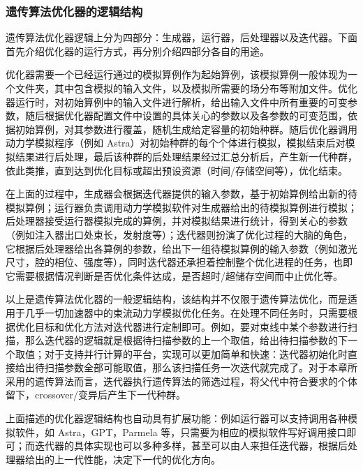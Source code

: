 \subsubsection{遗传算法优化器的逻辑结构}
遗传算法优化器逻辑上分为四部分：生成器，运行器，后处理器以及迭代器。下面首先介绍优化器的运行方式，再分别介绍四部分各自的用途。

优化器需要一个已经运行通过的模拟算例作为起始算例，该模拟算例一般体现为一个文件夹，其中包含模拟的输入文件，以及模拟所需要的场分布等附加文件。优化器运行时，对初始算例中的输入文件进行解析，给出输入文件中所有重要的可变参数，随后根据优化器配置文件中设置的具体关心的参数以及各参数的可变范围，依据初始算例，对其参数进行覆盖，随机生成给定容量的初始种群。随后优化器调用动力学模拟程序（例如 Astra）对初始种群的每个个体进行模拟，模拟结束后对模拟结果进行后处理，最后该种群的后处理结果经过汇总分析后，产生新一代种群，依此类推，直到达到优化目标或超出预设资源（时间/存储空间等），优化结束。


在上面的过程中，生成器会根据迭代器提供的输入参数，基于初始算例给出新的待模拟算例；运行器负责调用动力学模拟软件对生成器给出的待模拟算例进行模拟；后处理器接受运行器模拟完成的算例，并对模拟结果进行统计，得到关心的参数（例如注入器出口处束长，发射度等）；迭代器则扮演了优化过程的大脑的角色，它根据后处理器给出各算例的参数，给出下一组待模拟算例的输入参数（例如激光尺寸，腔的相位、强度等），同时迭代器还承担着控制整个优化进程的任务，也即它需要根据情况判断是否优化条件达成，是否超时/超储存空间而中止优化等。

以上是遗传算法优化器的一般逻辑结构，该结构并不仅限于遗传算法优化，而是适用于几乎一切加速器中的束流动力学模拟优化任务。在处理不同任务时，只需要根据优化目标和优化方法对迭代器进行定制即可。例如，要对束线中某个参数进行扫描，那么迭代器的逻辑就是根据待扫描参数的上一个取值，给出待扫描参数的下一个取值；对于支持并行计算的平台，实现可以更加简单和快速：迭代器初始化时直接给出待扫描参数全部可能取值，那么该扫描任务一次迭代就完成了。对于本章所采用的遗传算法而言，迭代器执行遗传算法的筛选过程，将父代中符合要求的个体留下，crossover/变异后产生下一代种群。

上面描述的优化器逻辑结构也自动具有扩展功能：例如运行器可以支持调用各种模拟软件，如 Astra，GPT，Parmela 等，只需要为相应的模拟软件写好调用接口即可；而迭代器的具体实现也可以多种多样，甚至可以由人来担任迭代器，根据后处理器给出的上一代性能，决定下一代的优化方向。


